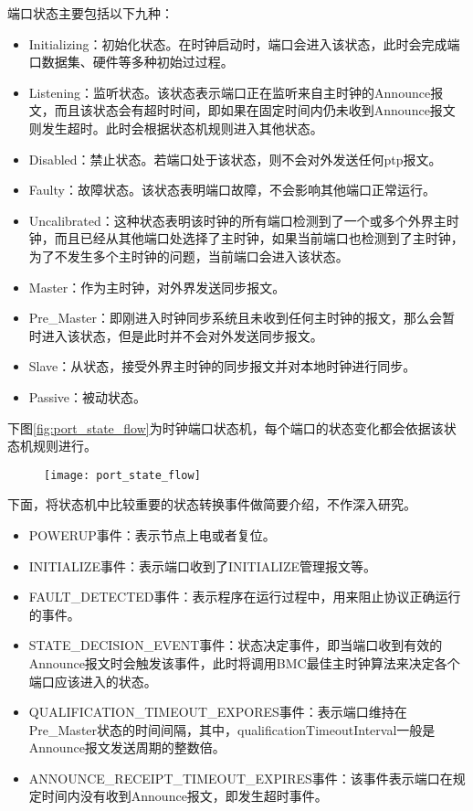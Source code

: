 端口状态主要包括以下九种：
\begin{itemize}[noitemsep,topsep=0pt,parsep=0pt,partopsep=0pt]
	\item Initializing：初始化状态。在时钟启动时，端口会进入该状态，此时会完成端口数据集、硬件等多种初始过过程。
	\item Listening：监听状态。该状态表示端口正在监听来自主时钟的Announce报文，而且该状态会有超时时间，即如果在固定时间内仍未收到Announce报文则发生超时。此时会根据状态机规则进入其他状态。
	\item Disabled：禁止状态。若端口处于该状态，则不会对外发送任何ptp报文。
	\item Faulty：故障状态。该状态表明端口故障，不会影响其他端口正常运行。
	\item Uncalibrated：这种状态表明该时钟的所有端口检测到了一个或多个外界主时钟，而且已经从其他端口处选择了主时钟，如果当前端口也检测到了主时钟，为了不发生多个主时钟的问题，当前端口会进入该状态。
	\item Master：作为主时钟，对外界发送同步报文。
	\item Pre\_Master：即刚进入时钟同步系统且未收到任何主时钟的报文，那么会暂时进入该状态，但是此时并不会对外发送同步报文。
	\item Slave：从状态，接受外界主时钟的同步报文并对本地时钟进行同步。
	\item Passive：被动状态。
\end{itemize}

下图\ref{fig:port_state_flow}为时钟端口状态机，每个端口的状态变化都会依据该状态机规则进行。

\begin{figure}[!hbp]
  \centering
  \begin{minipage}[b]{0.6\textwidth}
    \captionstyle{\centering}
    \centering
    \texttt{[image: port\_state\_flow]}
  \end{minipage}     
\end{figure}

下面，将状态机中比较重要的状态转换事件做简要介绍，不作深入研究。
\begin{itemize}[noitemsep,topsep=0pt,parsep=0pt,partopsep=0pt]
	\item POWERUP事件：表示节点上电或者复位。
	\item INITIALIZE事件：表示端口收到了INITIALIZE管理报文等。
	\item FAULT\_DETECTED事件：表示程序在运行过程中，用来阻止协议正确运行的事件。
	\item STATE\_DECISION\_EVENT事件：状态决定事件，即当端口收到有效的Announce报文时会触发该事件，此时将调用BMC最佳主时钟算法来决定各个端口应该进入的状态。
	\item QUALIFICATION\_TIMEOUT\_EXPORES事件：表示端口维持在Pre\_Master状态的时间间隔，其中，qualificationTimeoutInterval一般是Announce报文发送周期的整数倍。
	\item ANNOUNCE\_RECEIPT\_TIMEOUT\_EXPIRES事件：该事件表示端口在规定时间内没有收到Announce报文，即发生超时事件。
\end{itemize}

